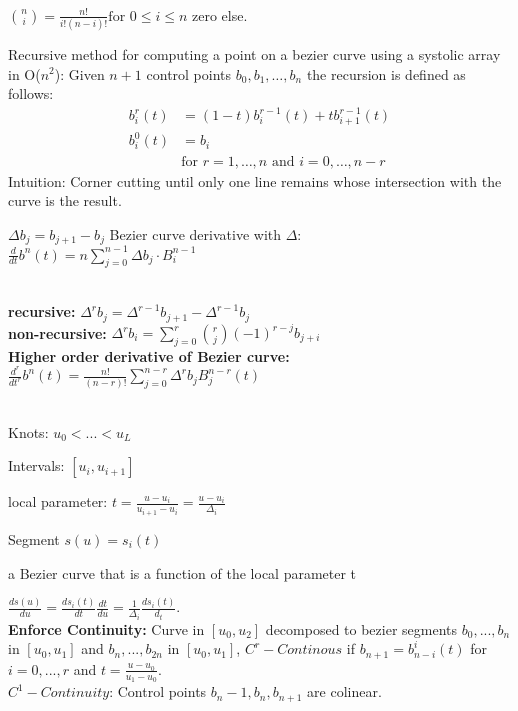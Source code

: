 \\
$\binom{n}{i} = \frac{n!}{i!(n-i)!} \text{for } 0 \leq i \leq n$ zero else.

Recursive method for computing a point on a bezier curve using a systolic array in O($n^2$):
Given \( n+1 \) control points \( b_0, b_1, \ldots, b_n \) the recursion is defined as follows:
\begin{align*}
b_i^r(t) &= (1 - t) b_i^{r-1}(t) + t b_{i+1}^{r-1}(t) \\
b_i^0(t) &= b_i \\
&\text{for } r = 1, \ldots, n \text{ and } i = 0, \ldots, n-r
\end{align*}
Intuition: Corner cutting until only one line remains whose intersection with the curve is the result. 

 $\Delta b_j = b_{j+1} - b_j$
Bezier curve derivative with $\Delta$: \\ $\frac{d}{dt}b^n(t) = n\sum_{j=0}^{n-1} \Delta b_j \cdot B_i^{n-1}$


 \\
\textbf{recursive:} $\Delta^r b_j = \Delta^{r-1}b_{j+1} - \Delta^{r-1}b_j$\\
\textbf{non-recursive:} $\Delta^r b_i = \sum_{j=0}^r \binom{r}{j} (-1)^{r-j} b_{j+i}$\\
\textbf{Higher order derivative of Bezier curve:} $\frac{d^r}{dt^r} b^n(t) = \frac{n!}{(n-r)!} \sum_{j=0}^{n-r} \Delta^r b_j B_j^{n-r}(t)$\\
\\
\begin{compactitem}
    \item Knots: $u_0 < ... <u_L$
    \item Intervals: $[u_i, u_{i+1}]$
    \item local parameter: $t = \frac{u - u_i}{u_{i+1} - u_i} = \frac{u - u_i}{\Delta_i}$
    \item Segment $s(u) = s_i(t)$
    \item a Bezier curve that is a function of the local parameter t
\end{compactitem}

$\frac{ds(u)}{du} = \frac{ds_i(t)}{dt}\frac{dt}{du} = \frac{1}{\Delta_i}\frac{ds_i(t)}{d_t}$. \\
\textbf{Enforce Continuity:} Curve in $[u_0, u_2]$ decomposed to bezier segments $b_0, ..., b_n$ in $[u_0, u_1]$ and $b_n, ..., b_{2n}$ in $[u_0, u_1]$, $C^r-Continous$ if $b_{n+1} = b_{n-i}^i(t)$ for $i = 0,...,r$ and $t = \frac{u - u_0}{u_1 - u_0 }$.\\
$C^1-Continuity$: Control points $b_n-1, b_n, b_{n+1}$ are colinear. 

